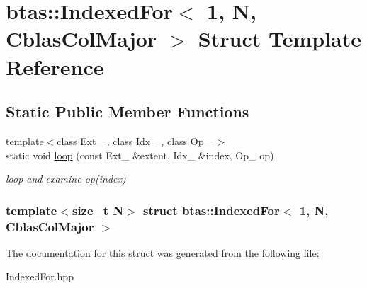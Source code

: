 \hypertarget{structbtas_1_1_indexed_for_3_011_00_01_n_00_01_cblas_col_major_01_4}{
\section{btas::IndexedFor$<$ 1, N, CblasColMajor $>$ Struct Template Reference}
\label{structbtas_1_1_indexed_for_3_011_00_01_n_00_01_cblas_col_major_01_4}
}
\subsection*{Static Public Member Functions}
\begin{DoxyCompactItemize}
\item 
\hypertarget{structbtas_1_1_indexed_for_3_011_00_01_n_00_01_cblas_col_major_01_4_a39347e040934d480e601cec11beb72ec}{
{\footnotesize template$<$class Ext\_\- , class Idx\_\- , class Op\_\- $>$ }\\static void \hyperlink{structbtas_1_1_indexed_for_3_011_00_01_n_00_01_cblas_col_major_01_4_a39347e040934d480e601cec11beb72ec}{loop} (const Ext\_\- \&extent, Idx\_\- \&index, Op\_\- op)}
\label{structbtas_1_1_indexed_for_3_011_00_01_n_00_01_cblas_col_major_01_4_a39347e040934d480e601cec11beb72ec}

\begin{DoxyCompactList}\small\item\em loop and examine op(index) \item\end{DoxyCompactList}\end{DoxyCompactItemize}
\subsubsection*{template$<$size\_\-t N$>$ struct btas::IndexedFor$<$ 1, N, CblasColMajor $>$}



The documentation for this struct was generated from the following file:\begin{DoxyCompactItemize}
\item 
IndexedFor.hpp\end{DoxyCompactItemize}
